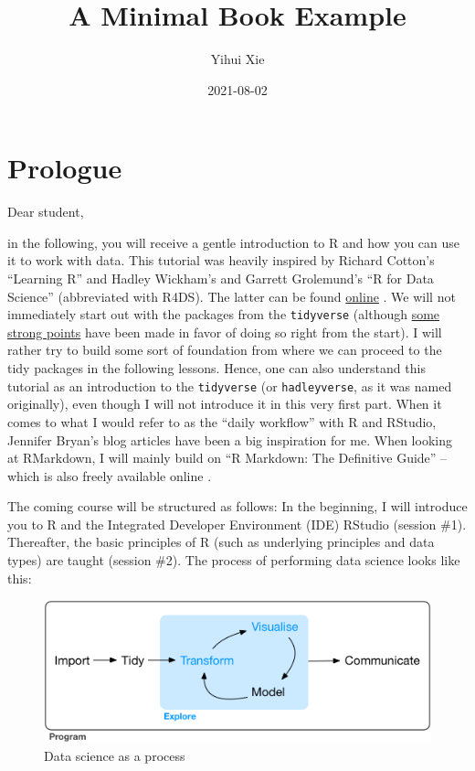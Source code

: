 \documentclass[
]{book}
\title{A Minimal Book Example}
\author{Yihui Xie}
\date{2021-08-02}
\begin{document}
\maketitle

{
\setcounter{tocdepth}{1}
\tableofcontents
}
\hypertarget{prologue}{%
\chapter{Prologue}\label{prologue}}

Dear student,

in the following, you will receive a gentle introduction to R and how you can use it to work with data. This tutorial was heavily inspired by Richard Cotton's ``Learning R'' \citep{cotton2013} and Hadley Wickham's and Garrett Grolemund's ``R for Data Science'' (abbreviated with R4DS). The latter can be found \href{https://r4ds.had.co.nz}{online} \citep{wickham2016a}. We will not immediately start out with the packages from the \texttt{tidyverse} (although \href{http://varianceexplained.org/r/teach-tidyverse/}{some strong points} have been made in favor of doing so right from the start). I will rather try to build some sort of foundation from where we can proceed to the tidy packages in the following lessons. Hence, one can also understand this tutorial as an introduction to the \texttt{tidyverse} \citep{wickham2019c} (or \texttt{hadleyverse}, as it was named originally), even though I will not introduce it in this very first part.
When it comes to what I would refer to as the ``daily workflow'' with R and RStudio, Jennifer Bryan's blog articles have been a big inspiration for me. When looking at RMarkdown, I will mainly build on ``R Markdown: The Definitive Guide'' -- which is also freely available online \citep{xie2018}.

The coming course will be structured as follows: In the beginning, I will introduce you to R and the Integrated Developer Environment (IDE) RStudio (session \#1). Thereafter, the basic principles of R (such as underlying principles and data types) are taught (session \#2). The process of performing data science looks like this:

\begin{figure}
\centering
\includegraphics{figures/data-science-process.png}
\caption{Data science as a process}
\end{figure}
\end{document}
